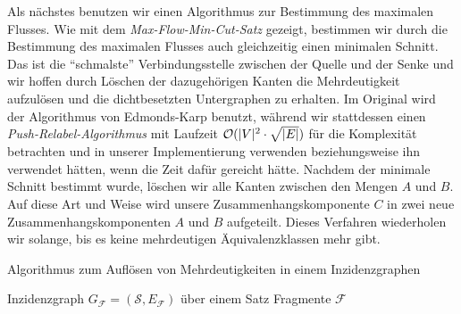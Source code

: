 Als nächstes benutzen wir einen Algorithmus zur Bestimmung des maximalen Flusses. Wie mit dem \emph{Max-Flow-Min-Cut-Satz} gezeigt, bestimmen wir durch die Bestimmung des maximalen Flusses auch gleichzeitig einen minimalen Schnitt. Das ist die \enquote{schmalste} Verbindungsstelle zwischen der Quelle und der Senke und wir hoffen durch Löschen der dazugehörigen Kanten die Mehrdeutigkeit aufzulösen und die dichtbesetzten Untergraphen zu erhalten. Im Original wird der Algorithmus von Edmonds-Karp benutzt, während wir stattdessen einen \emph{Push-Relabel-Algorithmus} mit Laufzeit \emph{$\mathcal{O}(|V|^2\cdot \sqrt{|E|})$} für die Komplexität betrachten und in unserer Implementierung verwenden beziehungsweise ihn verwendet hätten, wenn die Zeit dafür gereicht hätte. Nachdem der minimale Schnitt bestimmt wurde, löschen wir alle Kanten zwischen den Mengen $A$ und $B$. Auf diese Art und Weise wird unsere Zusammenhangskomponente $C$ in zwei neue Zusammenhangskomponenten $A$ und $B$ aufgeteilt. Dieses Verfahren wiederholen wir solange, bis es keine mehrdeutigen Äquivalenzklassen mehr gibt.  


\begin{algorithm}
	\caption{Algorithmus zum Auflösen von Mehrdeutigkeiten in einem Inzidenzgraphen}
	\label{alg:amb_res}
	\begin{algorithmic}[1]
		\Require Inzidenzgraph $G_{\mathcal{F}} = (\mathcal{S},E_{\mathcal{F}})$ über einem Satz Fragmente $\mathcal{F}$
				\EndWhile
			\EndWhile
		\EndProcedure
	\end{algorithmic}
\end{algorithm}

